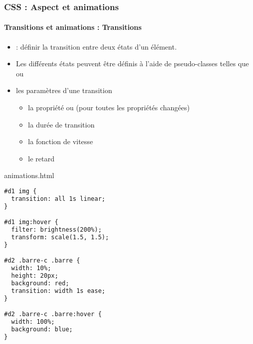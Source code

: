 \documentclass[xcolor=table]{beamer}
\begin{document}
\begin{frame}[fragile]
\frametitle{CSS : Aspect et animations}
\framesubtitle{Transitions et animations : Transitions}

\begin{minipage}{0.60\textwidth}
	\begin{itemize}
		\item {} : définir la transition entre deux états d'un élément.
		\item Les différents états peuvent être définis à l'aide de pseudo-classes telles que  ou 
		\item les paramètres d'une transition 
		\begin{itemize}
			\item la propriété ou  (pour toutes les propriétés changées)
			\item la durée de transition 
			\item la fonction de vitesse
			\item le retard
		\end{itemize}
	\end{itemize}
\end{minipage}
%
\begin{minipage}{0.38\textwidth}
\begin{exampleblock}{animations.html}
\lstset{escapeinside=**}
\tiny\bfseries
\begin{lstlisting}[language={html}]
#d1 img {
  transition: all 1s linear;
}

#d1 img:hover {
  filter: brightness(200%);
  transform: scale(1.5, 1.5);
}

#d2 .barre-c .barre {
  width: 10%;
  height: 20px;
  background: red;
  transition: width 1s ease;
}

#d2 .barre-c .barre:hover {
  width: 100%;
  background: blue;
}
\end{lstlisting}
\end{exampleblock}
\end{minipage}
\end{frame}
\end{document}
